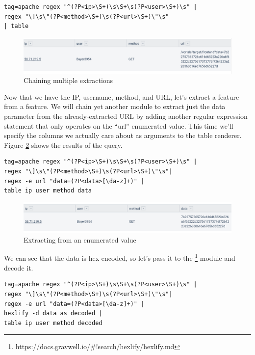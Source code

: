 \begin{Verbatim}[breaklines=true]
tag=apache regex "^(?P<ip>\S+)\s\S+\s(?P<user>\S+)\s" |
regex "\]\s\"(?P<method>\S+)\s(?P<url>\S+)\"\s"
| table
\end{Verbatim}

\begin{figure}
	\includegraphics[width=0.8\linewidth]{images/extract-chaining.png}
	\caption{Chaining multiple extractions}
	\label{fig:extract-chaining}
\end{figure}

Now that we have the IP, username, method, and URL, let's extract a
feature from a feature. We will chain yet another module to extract
just the data parameter from the already-extracted URL by adding another
regular expression statement that only operates on the ``url''
enumerated value. This time we'll specify the columns we actually care
about as arguments to the table renderer. Figure \ref{fig:extract-ev} shows
the results of the query.

\begin{Verbatim}[breaklines=true]
tag=apache regex "^(?P<ip>\S+)\s\S+\s(?P<user>\S+)\s" |
regex "\]\s\"(?P<method>\S+)\s(?P<url>\S+)\"\s"|
regex -e url "data=(?P<data>[\da-z]+)" |
table ip user method data
\end{Verbatim}

\begin{figure}
	\includegraphics[width=0.8\linewidth]{images/extract-ev.png}
	\caption{Extracting from an enumerated value}
	\label{fig:extract-ev}
\end{figure}

We can see that the data is hex encoded, so let's pass it to the
\footnote{https://docs.gravwell.io/\#!search/hexlify/hexlify.md} module
and decode it.

\begin{Verbatim}[breaklines=true]
tag=apache regex "^(?P<ip>\S+)\s\S+\s(?P<user>\S+)\s" |
regex "\]\s\"(?P<method>\S+)\s(?P<url>\S+)\"\s"|
regex -e url "data=(?P<data>[\da-z]+)" |
hexlify -d data as decoded |
table ip user method decoded
\end{Verbatim}

